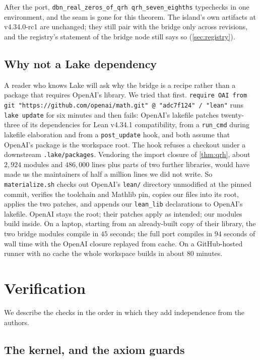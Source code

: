 \documentclass[11pt]{article}
\theoremstyle{definition}
\newcommand{\lean}[1]{\texttt{#1}}
\begin{document}
After the port, \lean{dbn\_real\_zeros\_of\_qrh qrh\_seven\_eighths} typechecks in one environment, and the seam is gone for this theorem. The island's own artifacts at v4.34.0-rc1 are unchanged; they still pair with the bridge only across revisions, and the registry's statement of the bridge node still says so (\cref{sec:registry}).

\subsection{Why not a Lake dependency}

A reader who knows Lake will ask why the bridge is a recipe rather than a package that requires OpenAI's library. We tried that first. \lean{require OAI from git "https://github.com/openai/math.git" @ "adc7f124" / "lean"} runs \lean{lake update} for six minutes and then fails: OpenAI's lakefile patches twenty-three of its dependencies for Lean v4.34.1 compatibility, from a \lean{run\_cmd} during lakefile elaboration and from a \lean{post\_update} hook, and both assume that OpenAI's package is the workspace root. The hook refuses a checkout under a downstream \lean{.lake/packages}. Vendoring the import closure of \cref{thm:qrh}, about $2{,}924$ modules and $486{,}000$ lines plus parts of two further libraries, would have made us the maintainers of half a million lines we did not write. So \lean{materialize.sh} checks out OpenAI's \lean{lean/} directory unmodified at the pinned commit, verifies the toolchain and Mathlib pin, copies our files into its root, applies the two patches, and appends our \lean{lean\_lib} declarations to OpenAI's lakefile. OpenAI stays the root; their patches apply as intended; our modules build inside. On a laptop, starting from an already-built copy of their library, the two bridge modules compile in $45$ seconds; the full port compiles in $94$ seconds of wall time with the OpenAI closure replayed from cache. On a GitHub-hosted runner with no cache the whole workspace builds in about $80$ minutes.

\section{Verification}\label{sec:verification}

We describe the checks in the order in which they add independence from the authors.

\subsection{The kernel, and the axiom guards}
\end{document}
